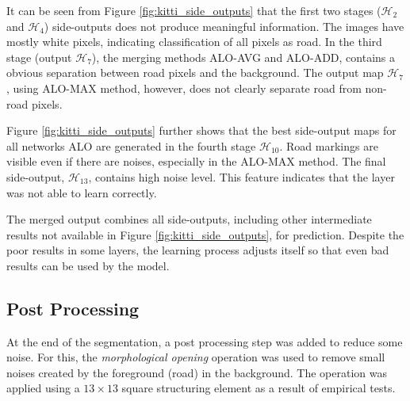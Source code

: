 It can be seen from Figure \ref{fig:kitti_side_outputs} that the first two stages ($\mathcal{H}_2$ and $\mathcal{H}_4$) side-outputs does not produce meaningful information.
The images have mostly white pixels, indicating classification of all pixels as road.
In the third stage (output $\mathcal{H}_7$), the merging methods ALO-AVG and ALO-ADD, contains a obvious separation between road pixels and the background.
The output map $\mathcal{H}_7$, using ALO-MAX method, however, does not clearly separate road from non-road pixels.

Figure \ref{fig:kitti_side_outputs} further shows that the best side-output maps for all networks ALO are generated in the fourth stage $\mathcal{H}_{10}$. 
Road markings are visible even if there are noises, especially in the ALO-MAX method.
The final side-output, $\mathcal{H}_{13}$, contains high noise level.
This feature indicates that the layer was not able to learn correctly.

The merged output combines all side-outputs, including other intermediate results not available in Figure \ref{fig:kitti_side_outputs}, for prediction.
Despite the poor results in some layers, the learning process adjusts itself so that even bad results can be used by the model.

\subsection{Post Processing}
\label{cap6_pos_processamento}

At the end of the segmentation, a post processing step was added to reduce some noise.
For this, the \textit{morphological opening} operation was used to remove small noises created by the foreground (road) in the background.
The operation was applied using a $13 \times 13$ square structuring element as a result of empirical tests.

% 

